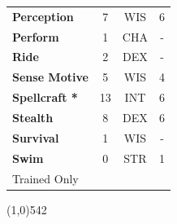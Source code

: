 \documentclass[letterpaper]{article}
\newcommand{\fullline}{\noindent\line(1,0){542} \\}
\begin{document}
\begin{table}[h!]
{{\begin{tabular}{l  c  c  c}
        \hline
        \textbf{Perception} & 7 & {\footnotesize WIS} & 6 \\
        \textbf{Perform} & 1 & {\footnotesize CHA} & - \\
        \hline
        \textbf{Ride} & 2 & {\footnotesize DEX} & - \\
        \textbf{Sense Motive} & 5 & {\footnotesize WIS} & 4 \\
        \hline
        \textbf{Spellcraft *} & 13 & {\footnotesize INT} & 6 \\
        \textbf{Stealth} & 8 & {\footnotesize DEX} & 6 \\
        \hline
        \textbf{Survival} & 1 & {\footnotesize WIS} & - \\
        \textbf{Swim} & 0 & {\footnotesize STR} & 1 \\
        {\footnotesize * Trained Only} \\
        \end{tabular}
    }
}
\vspace{-1.5em}
\end{table} \par

\vspace{-1.5em}
\fullline
\vspace{-1em}
\end{document}
